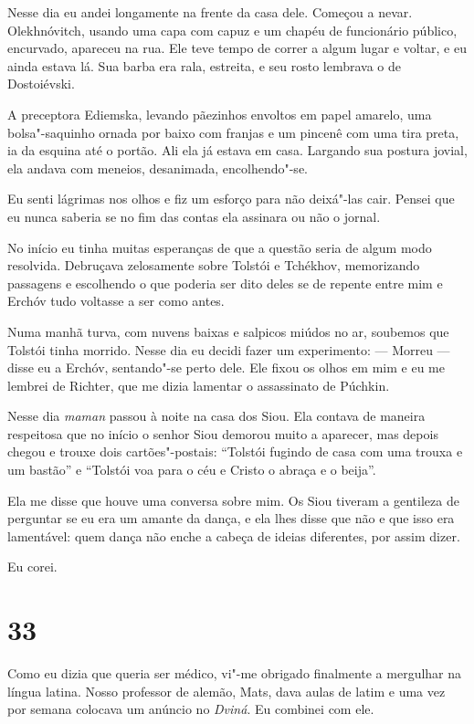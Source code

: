 Nesse dia eu andei longamente na frente da casa dele. Começou a nevar.
Olekhnóvitch, usando uma capa com capuz e um chapéu de funcionário
público, encurvado, apareceu na rua. Ele teve tempo de correr a algum
lugar e voltar, e eu ainda estava lá. Sua barba era rala, estreita, e
seu rosto lembrava o de Dostoiévski.

A preceptora Ediemska, levando pãezinhos envoltos em papel amarelo, uma
bolsa"-saquinho ornada por baixo com franjas e um pincenê com uma tira
preta, ia da esquina até o portão. Ali ela já estava em casa. Largando
sua postura jovial, ela andava com meneios, desanimada, encolhendo"-se.

Eu senti lágrimas nos olhos e fiz um esforço para não deixá"-las cair.
Pensei que eu nunca saberia se no fim das contas ela assinara ou não o
jornal.

No início eu tinha muitas esperanças de que a questão seria de algum
modo resolvida. Debruçava zelosamente sobre Tolstói e Tchékhov,
memorizando passagens e escolhendo o que poderia ser dito deles se de
repente entre mim e Erchóv tudo voltasse a ser como antes.

Numa manhã turva, com nuvens baixas e salpicos miúdos no ar, soubemos
que Tolstói tinha morrido. Nesse dia eu decidi fazer um experimento: ---
Morreu --- disse eu a Erchóv, sentando"-se perto dele. Ele fixou os olhos
em mim e eu me lembrei de Richter, que me dizia lamentar o assassinato
de Púchkin.

Nesse dia \emph{maman} passou à noite na casa dos Siou. Ela contava de
maneira respeitosa que no início o senhor Siou demorou muito a aparecer,
mas depois chegou e trouxe dois cartões"-postais: ``Tolstói fugindo de
casa com uma trouxa e um bastão'' e ``Tolstói voa para o céu e Cristo o
abraça e o beija''.

Ela me disse que houve uma conversa sobre mim. Os Siou tiveram a
gentileza de perguntar se eu era um amante da dança, e ela lhes disse
que não e que isso era lamentável: quem dança não enche a cabeça de
ideias diferentes, por assim dizer.

Eu corei.

\section{33}

Como eu dizia que queria ser médico, vi"-me obrigado finalmente a
mergulhar na língua latina. Nosso professor de alemão, Mats, dava aulas
de latim e uma vez por semana colocava um anúncio no \emph{Dviná}. Eu
combinei com ele.

